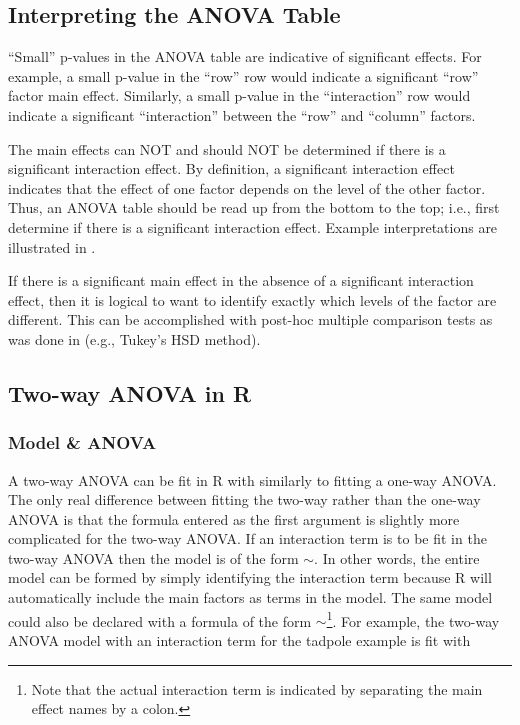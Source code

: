 \documentclass[10pt,openany]{book}\usepackage[]{graphicx}\usepackage[]{color}
\begin{document}
\subsection{Interpreting the ANOVA Table}
``Small'' p-values in the ANOVA table are indicative of significant effects.  For example, a small p-value in the ``row'' row would indicate a significant ``row'' factor main effect.  Similarly, a small p-value in the ``interaction'' row would indicate a significant ``interaction'' between the ``row'' and ``column'' factors.

The main effects can NOT and should NOT be determined if there is a significant interaction effect.  By definition, a significant interaction effect indicates that the effect of one factor depends on the level of the other factor.  Thus, an ANOVA table should be read up from the bottom to the top; i.e., first determine if there is a significant interaction effect.  Example interpretations are illustrated in .


If there is a significant main effect in the absence of a significant interaction effect, then it is logical to want to identify exactly which levels of the factor are different.  This can be accomplished with post-hoc multiple comparison tests as was done in  (e.g., Tukey's HSD method).


\subsection{Two-way ANOVA in R}
\subsubsection*{Model \& ANOVA}
A two-way ANOVA can be fit in R with  similarly to fitting a one-way ANOVA.  The only real difference between fitting the two-way rather than the one-way ANOVA is that the formula entered as the first argument is slightly more complicated for the two-way ANOVA.  If an interaction term is to be fit in the two-way ANOVA then the model is of the form $\sim$.  In other words, the entire model can be formed by simply identifying the interaction term because R will automatically include the main factors as terms in the model.  The same model could also be declared with a formula of the form $\sim$\footnote{Note that the actual interaction term is indicated by separating the main effect names by a colon.}.  For example, the two-way ANOVA model with an interaction term for the tadpole example is fit with
\end{document}

